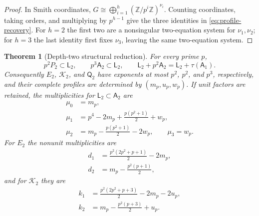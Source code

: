 \documentclass[12pt,a4paper]{article}
\newtheorem{theorem}{Theorem}[section]
\theoremstyle{definition}
\newcommand{\Z}{\mathbb Z}
\newcommand{\A}{\mathsf A}
\newcommand{\LL}{\mathsf L}
\newcommand{\QQ}{\mathsf Q}
\begin{document}
\begin{proof}
In Smith coordinates,
$G\cong\bigoplus_{i=1}^h(\Z/p^i\Z)^{\nu_i}$.  Counting coordinates, taking
orders, and multiplying by $p^{h-1}$ give the three identities in
\eqref{eq:profile-recovery}.  For $h=2$ the first two are a nonsingular
two-equation system for $\nu_1,\nu_2$; for $h=3$ the last identity first fixes
$\nu_3$, leaving the same two-equation system.
\end{proof}

\begin{theorem}[Depth-two structural reduction]
\label{thm:depth-two-reduction}
For every prime $p$,
\[
 p^2P_2\subset\LL_2,\qquad p^3\A_2\subset\LL_2,
 \qquad \LL_2+p^2\A_2=\LL_2+\tau(\A_1).
\]
Consequently $E_2$, $\mathcal K_2$, and $\QQ_2$ have exponents at most $p^2$,
$p^2$, and $p^3$, respectively, and their complete profiles are determined
by $(m_p,u_p,w_p)$.  If unit factors are retained, the multiplicities for
$\LL_2\subset\A_2$ are
\begin{align}
 \mu_0&=m_p,\nonumber\\
 \mu_1&=p^4-2m_p+\frac{p(p^2+1)}2+w_p,\nonumber\\
 \mu_2&=m_p-\frac{p(p^2+1)}2-2w_p,\qquad \mu_3=w_p.
 \label{eq:q-from-mw}
\end{align}
For $E_2$ the nonunit multiplicities are
\begin{align}
 d_1&=\frac{p^2(2p^2+p+1)}2-2m_p,\nonumber\\
 d_2&=m_p-\frac{p^2(p+1)}2,\label{eq:E-from-m}
\end{align}
and for $\mathcal K_2$ they are
\begin{align}
 k_1&=\frac{p^2(2p^2+p+3)}2-2m_p-2u_p,\nonumber\\
 k_2&=m_p-\frac{p^2(p+3)}2+u_p.\label{eq:K-from-mu}
\end{align}
\end{theorem}
\end{document}
